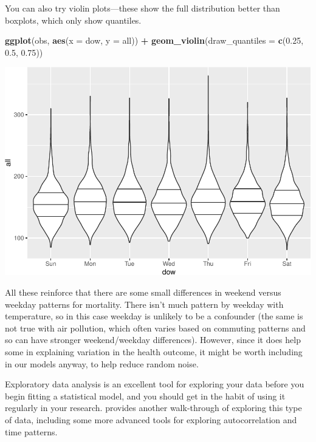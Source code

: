 \documentclass[
]{book}
\newenvironment{Shaded}{\begin{snugshade}}{\end{snugshade}}
\newcommand{\DataTypeTok}[1]{\textcolor[rgb]{0.13,0.29,0.53}{#1}}
\newcommand{\FloatTok}[1]{\textcolor[rgb]{0.00,0.00,0.81}{#1}}
\newcommand{\KeywordTok}[1]{\textcolor[rgb]{0.13,0.29,0.53}{\textbf{#1}}}
\newcommand{\NormalTok}[1]{#1}
\newcommand{\OperatorTok}[1]{\textcolor[rgb]{0.81,0.36,0.00}{\textbf{#1}}}
\newcommand{\StringTok}[1]{\textcolor[rgb]{0.31,0.60,0.02}{#1}}
\begin{document}
You can also try violin plots---these show the full distribution better than
boxplots, which only show quantiles.

\begin{Shaded}
\begin{Highlighting}[]
\KeywordTok{ggplot}\NormalTok{(obs, }\KeywordTok{aes}\NormalTok{(}\DataTypeTok{x =}\NormalTok{ dow, }\DataTypeTok{y =}\NormalTok{ all)) }\OperatorTok{+}\StringTok{ }
\StringTok{  }\KeywordTok{geom_violin}\NormalTok{(}\DataTypeTok{draw_quantiles =} \KeywordTok{c}\NormalTok{(}\FloatTok{0.25}\NormalTok{, }\FloatTok{0.5}\NormalTok{, }\FloatTok{0.75}\NormalTok{))}
\end{Highlighting}
\end{Shaded}

\includegraphics{adv_epi_analysis_files/figure-latex/unnamed-chunk-22-1.pdf}

All these reinforce that there are some small differences in weekend versus weekday
patterns for mortality. There isn't much pattern by weekday with temperature, so
in this case weekday is unlikely to be a confounder (the same is not true with
air pollution, which often varies based on commuting patterns and so can have
stronger weekend/weekday differences). However, since it does help some in explaining
variation in the health outcome, it might be worth including in our models anyway,
to help reduce random noise.

Exploratory data analysis is an excellent tool for exploring your data before
you begin fitting a statistical model, and you should get in the habit of using
it regularly in your research. \citet{dominici2008statistical5} provides another walk-through of exploring this type of data, including some more advanced tools
for exploring autocorrelation and time patterns.
\end{document}
